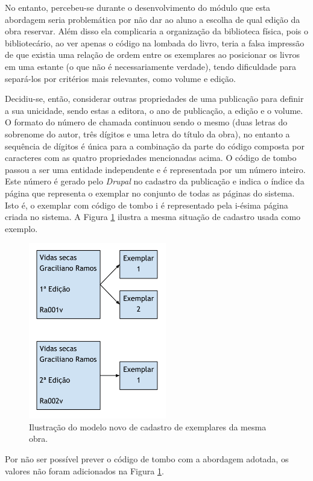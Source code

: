 \documentclass[a4paper]{article}
\begin{document}
No entanto, percebeu-se durante o desenvolvimento do módulo que esta abordagem seria problemática por não dar ao aluno a escolha de qual edição da obra reservar. Além disso ela complicaria a organização da biblioteca física, pois o bibliotecário, ao ver apenas o código na lombada do livro, teria a falsa impressão de que existia uma relação de ordem entre os exemplares ao posicionar os livros em uma estante (o que não é necessariamente verdade), tendo dificuldade para separá-los por critérios mais relevantes, como volume e edição.

Decidiu-se, então, considerar outras propriedades de uma publicação para definir a sua unicidade, sendo estas a editora, o ano de publicação, a edição e o volume. O formato do número de chamada continuou sendo o mesmo (duas letras do sobrenome do autor, três dígitos e uma letra do título da obra), no entanto a sequência de dígitos é única para a combinação da parte do código composta por caracteres com as quatro propriedades mencionadas acima. O código de tombo passou a ser uma entidade independente e é representada por um número inteiro. Este número é gerado pelo \textit{Drupal} no cadastro da publicação e indica o índice da página que representa o exemplar no conjunto de todas as páginas do sistema.  Isto é, o exemplar com código de tombo i é representado pela i-ésima página criada no sistema. A Figura \ref{tombo-novo} ilustra a mesma situação de cadastro usada como exemplo.

\begin{figure}[pbth!]
\centering
\includegraphics[width=60mm]{img/tombo-novo.png}
\caption{Ilustração do modelo novo de cadastro de exemplares da mesma obra.\label{tombo-novo}}
\end{figure}

Por não ser possível prever o código de tombo com a abordagem adotada, os valores não foram adicionados na Figura \ref{tombo-novo}.
\end{document}
